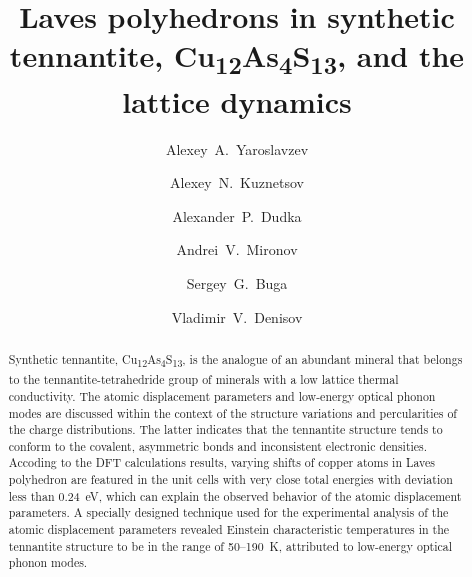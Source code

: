 \documentclass[preprint,review,12pt]{elsarticle}
\begin{document}
\begin{frontmatter}



\title{Laves polyhedrons in synthetic tennantite, Cu\textsubscript{12}As\textsubscript{4}S\textsubscript{13}, and the lattice dynamics}

\author[TISNCM]{Alexey~A.~Yaroslavzev}
\author[MSU,ICRAS]{Alexey~N.~Kuznetsov}
\author[SIC]{Alexander~P.~Dudka}
\author[MSU]{Andrei~V.~Mironov}
\author[MIPT,TISNCM]{Sergey~G.~Buga}
\author[TISNCM]{Vladimir~V.~Denisov}

\address[TISNCM]{Technological Institute for Superhard and Novel Carbon Materials, 108840, Troitsk, Moscow, Russia}
\address[MSU]{Department of Chemistry, Lomonosov Moscow State University, 119991, Moscow, Russia}
\address[ICRAS]{Kurnakov Institute of General and Inorganic Chemistry RAS, 119991, Moscow, Russia}
\address[SIC]{Shubnikov Institute of Crystallography of Federal Scientific Research Centre “Crystallography and Photonics” of Russian Academy of Sciences, Leninskiy Prospekt 59, 119333, Moscow, Russia}
\address[MIPT]{Moscow Institute of Physics and Technology, 141700, 9 Institutsky lane, Dolgoprudny, Russia}


\begin{abstract}
Synthetic tennantite, Cu\textsubscript{12}As\textsubscript{4}S\textsubscript{13}, is the analogue of an abundant mineral that belongs to the tennantite-tetrahedride group of minerals with a low lattice thermal conductivity.
The atomic displacement parameters and low-energy optical phonon modes are discussed within the context of the structure variations and percularities of the charge distributions.
The latter indicates that the tennantite structure tends to conform to the covalent, asymmetric bonds and inconsistent electronic densities.
Accoding to the DFT calculations results, varying shifts of copper atoms in Laves polyhedron are featured in the unit cells with very close total energies with deviation less than 0.24~eV, which can explain the observed behavior of the atomic displacement parameters.
A specially designed  technique used for the experimental analysis of the atomic displacement parameters  revealed Einstein characteristic temperatures in the tennantite structure to be in the range of 50--190~K, attributed to  low-energy optical phonon modes.



\end{abstract}
\end{frontmatter}
\end{document}
